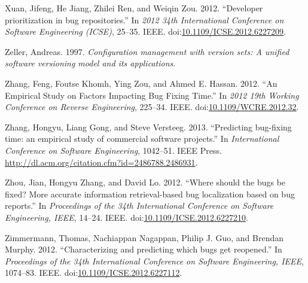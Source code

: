 \documentclass[natbib]{svjour3}
\begin{document}
\hypertarget{ref-Xuan2012}{}
Xuan, Jifeng, He Jiang, Zhilei Ren, and Weiqin Zou. 2012. ``Developer
prioritization in bug repositories.'' In \emph{2012 34th International
Conference on Software Engineering (ICSE)}, 25--35. IEEE.
doi:\href{https://doi.org/10.1109/ICSE.2012.6227209}{10.1109/ICSE.2012.6227209}.

\hypertarget{ref-Zeller1997}{}
Zeller, Andreas. 1997. \emph{Configuration management with version sets:
A unified software versioning model and its applications}.

\hypertarget{ref-Zhang2012}{}
Zhang, Feng, Foutse Khomh, Ying Zou, and Ahmed E. Hassan. 2012. ``An
Empirical Study on Factors Impacting Bug Fixing Time.'' In \emph{2012
19th Working Conference on Reverse Engineering}, 225--34. IEEE.
doi:\href{https://doi.org/10.1109/WCRE.2012.32}{10.1109/WCRE.2012.32}.

\hypertarget{ref-Zhang2013}{}
Zhang, Hongyu, Liang Gong, and Steve Versteeg. 2013. ``Predicting
bug-fixing time: an empirical study of commercial software projects.''
In \emph{International Conference on Software Engineering}, 1042--51.
IEEE Press. \url{http://dl.acm.org/citation.cfm?id=2486788.2486931}.

\hypertarget{ref-Zhou2012}{}
Zhou, Jian, Hongyu Zhang, and David Lo. 2012. ``Where should the bugs be
fixed? More accurate information retrieval-based bug localization based
on bug reports.'' In \emph{Proceedings of the 34th International
Conference on Software Engineering, IEEE}, 14--24. IEEE.
doi:\href{https://doi.org/10.1109/ICSE.2012.6227210}{10.1109/ICSE.2012.6227210}.

\hypertarget{ref-Zimmermann2012}{}
Zimmermann, Thomas, Nachiappan Nagappan, Philip J. Guo, and Brendan
Murphy. 2012. ``Characterizing and predicting which bugs get reopened.''
In \emph{Proceedings of the 34th International Conference on Software
Engineering, IEEE}, 1074--83. IEEE.
doi:\href{https://doi.org/10.1109/ICSE.2012.6227112}{10.1109/ICSE.2012.6227112}.
\end{document}
